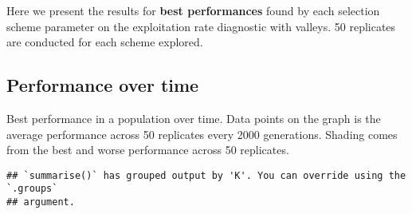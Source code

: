 \documentclass[]{book}
\newenvironment{Shaded}{\begin{snugshade}}{\end{snugshade}}
\newcommand{\DataTypeTok}[1]{\textcolor[rgb]{0.13,0.29,0.53}{#1}}
\newcommand{\KeywordTok}[1]{\textcolor[rgb]{0.13,0.29,0.53}{\textbf{#1}}}
\newcommand{\NormalTok}[1]{#1}
\newcommand{\OperatorTok}[1]{\textcolor[rgb]{0.81,0.36,0.00}{\textbf{#1}}}
\newcommand{\StringTok}[1]{\textcolor[rgb]{0.31,0.60,0.02}{#1}}
\begin{document}
Here we present the results for \textbf{best performances} found by each selection scheme parameter on the exploitation rate diagnostic with valleys.
50 replicates are conducted for each scheme explored.

\hypertarget{performance-over-time-15}{%
\subsection{Performance over time}\label{performance-over-time-15}}

Best performance in a population over time.
Data points on the graph is the average performance across 50 replicates every 2000 generations.
Shading comes from the best and worse performance across 50 replicates.

\begin{Shaded}
\end{Shaded}

\begin{verbatim}
## `summarise()` has grouped output by 'K'. You can override using the `.groups`
## argument.
\end{verbatim}
\end{document}
